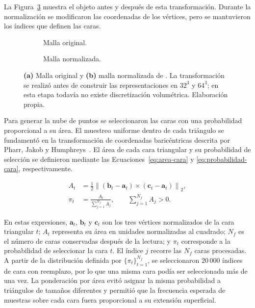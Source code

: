 La Figura~\ref{fig:mallas} muestra el objeto antes y después de esta transformación. Durante la normalización se modificaron las coordenadas de los vértices, pero se mantuvieron los índices que definen las caras.
\begin{figure}[htbp]
\centering
\begin{subfigure}[t]{.48\textwidth}
\centering
{}
\caption{Malla original.}\label{fig:malla-original}
\end{subfigure}
\hfill
\begin{subfigure}[t]{.48\textwidth}
\centering
{}
\caption{Malla normalizada.}\label{fig:malla-normalizada}
\end{subfigure}
\caption{\textbf{(a)} Malla original y \textbf{(b)} malla normalizada de \protect{}. La transformación se realizó antes de construir las representaciones en $32^3$ y $64^3$; en esta etapa todavía no existe discretización volumétrica. Elaboración propia.}
\label{fig:mallas}
\end{figure}

Para generar la nube de puntos se seleccionaron las caras con una
probabilidad proporcional a su área. El muestreo uniforme dentro de
cada triángulo se fundamentó en la transformación de coordenadas
baricéntricas descrita por Pharr, Jakob y
Humphreys~\parencite{pbrt}. El área de cada cara triangular y su
probabilidad de selección se definieron mediante las
Ecuaciones~\eqref{eq:area-cara} y \eqref{eq:probabilidad-cara},
respectivamente.

\begin{subequations}\label{eq:areas}
\begin{align}
A_t
&=
\frac{1}{2}
\left\|
(\mathbf b_t-\mathbf a_t)
\times
(\mathbf c_t-\mathbf a_t)
\right\|_2,
\label{eq:area-cara}\\
\pi_t
&=
\frac{A_t}
{\displaystyle\sum_{j=1}^{N_f}A_j},
\qquad
\sum_{j=1}^{N_f}A_j>0.
\label{eq:probabilidad-cara}
\end{align}
\end{subequations}

En estas expresiones, $\mathbf a_t$, $\mathbf b_t$ y $\mathbf c_t$
son los tres vértices normalizados de la cara triangular $t$;
$A_t$ representa su área en unidades normalizadas al cuadrado;
$N_f$ es el número de caras conservadas después de la lectura; y
$\pi_t$ corresponde a la probabilidad de seleccionar la cara $t$.
El índice $j$ recorre las $N_f$ caras procesadas. A partir de la
distribución definida por $\{\pi_t\}_{t=1}^{N_f}$, se seleccionaron
$20\,000$ índices de cara con reemplazo, por lo que una misma cara
podía ser seleccionada más de una vez. La ponderación por área evitó
asignar la misma probabilidad a triángulos de tamaños diferentes y
permitió que la frecuencia esperada de muestras sobre cada cara fuera
proporcional a su extensión superficial.

